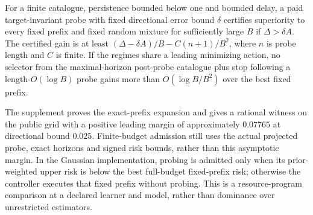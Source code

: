 \begin{corollary}
For a finite catalogue, persistence bounded below one and bounded delay, a paid target-invariant probe with fixed directional error bound $\delta$ certifies superiority to every fixed prefix and fixed random mixture for sufficiently large $B$ if $\Delta>\delta A$.
The certified gain is at least $(\Delta-\delta A)/B-C(n+1)/B^2$, where $n$ is probe length and $C$ is finite.
If the regimes share a leading minimizing action, no selector from the maximal-horizon post-probe catalogue plus stop following a length-$O(\log B)$ probe gains more than $O(\log B/B^2)$ over the best fixed prefix.
\label{cor:leading-prefix-separation}
\end{corollary}

The supplement proves the exact-prefix expansion and gives a rational witness on the public grid with a positive leading margin of approximately $0.07765$ at directional bound $0.025$.
Finite-budget admission still uses the actual projected probe, exact horizons and signed risk bounds, rather than this asymptotic margin.
In the Gaussian implementation, probing is admitted only when its prior-weighted upper risk is below the best full-budget fixed-prefix risk; otherwise the controller executes that fixed prefix without probing.
This is a resource-program comparison at a declared learner and model, rather than dominance over unrestricted estimators.
